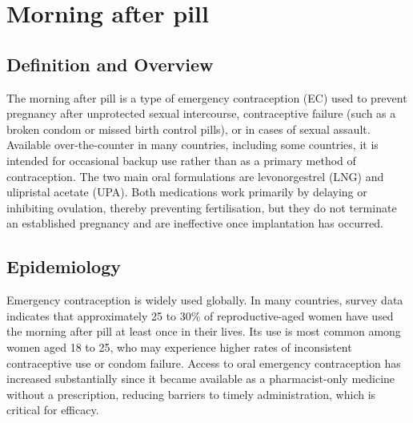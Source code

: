 \chapter{Morning after pill}

\section*{Definition and Overview}
The morning after pill is a type of emergency contraception (EC) used to prevent pregnancy after unprotected sexual intercourse, contraceptive failure (such as a broken condom or missed birth control pills), or in cases of sexual assault. Available over-the-counter in many countries, including some countries, it is intended for occasional backup use rather than as a primary method of contraception. The two main oral formulations are levonorgestrel (LNG) and ulipristal acetate (UPA). Both medications work primarily by delaying or inhibiting ovulation, thereby preventing fertilisation, but they do not terminate an established pregnancy and are ineffective once implantation has occurred.

\section*{Epidemiology}
Emergency contraception is widely used globally. In many countries, survey data indicates that approximately 25 to 30\% of reproductive-aged women have used the morning after pill at least once in their lives. Its use is most common among women aged 18 to 25, who may experience higher rates of inconsistent contraceptive use or condom failure. Access to oral emergency contraception has increased substantially since it became available as a pharmacist-only medicine without a prescription, reducing barriers to timely administration, which is critical for efficacy.

